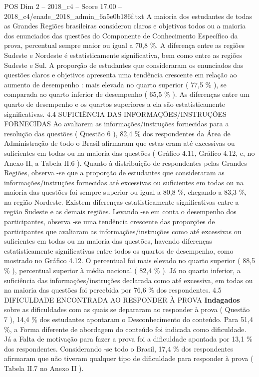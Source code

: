 \begin{textsample}{POS Dim 2 – 2018\_c4 – Score 17.00 – 2018\_c4/enade\_2018\_admin\_6a5e0b186f.txt}
A maioria dos estudantes de todas as Grandes Regiões brasileiras considerou claros e objetivos todos ou a maioria dos enunciados das questões do Componente de Conhecimento Específico da prova, percentual sempre maior ou igual a 70,8 \%.
A diferença entre as regiões Sudeste e Nordeste é estatisticamente significativa, bem como entre as regiões Sudeste e Sul.
A proporção de estudantes que consideraram os enunciados das questões claros e objetivos apresenta uma tendência crescente em relação ao aumento de desempenho : mais elevada no quarto superior ( 77,5 \% ), se comparada ao quarto inferior de desempenho ( 65,5 \% ).
As diferenças entre um quarto de desempenho e os quartos superiores a ela são estatisticamente significativas. 4.4 SUFICIÊNCIA DAS INFORMAÇÕES/INSTRUÇÕES FORNECIDAS Ao avaliarem as informações/instruções fornecidas para a resolução das questões ( Questão 6 ), 82,4 \% dos respondentes da Área de Administração de todo o Brasil afirmaram que estas eram até excessivas ou suficientes em todas ou na maioria das questões ( Gráfico 4.11, Gráfico 4.12, e, no Anexo II, a Tabela II.6 ).
Quanto à distribuição de respondentes pelas Grandes Regiões, observa -se que a proporção de estudantes que consideraram as informações/instruções fornecidas até excessivas ou suficientes em todas ou na maioria das questões foi sempre superior ou igual a 80,8 \%, chegando a 83,3 \%, na região Nordeste.
Existem diferenças estatisticamente significativas entre a região Sudeste e as demais regiões.
Levando -se em conta o desempenho dos participantes, observa -se uma tendência crescente das proporções de participantes que avaliaram as informações/instruções como até excessivas ou suficientes em todas ou na maioria das questões, havendo diferenças estatisticamente significativas entre todos os quartos de desempenho, como mostrado no Gráfico 4.12.
O percentual foi mais elevado no quarto superior ( 88,5 \% ), percentual superior à média nacional ( 82,4 \% ).
Já no quarto inferior, a suficiência das informações/instruções declarada como até excessiva, em todas ou na maioria das questões foi percebida por 76,6 \% dos respondentes. 4.5 DIFICULDADE ENCONTRADA AO RESPONDER À PROVA \textbf{Indagados} sobre as dificuldades com as quais se depararam ao responder à prova ( Questão 7 ), 14,4 \% dos estudantes apontaram o Desconhecimento do conteúdo.
Para 51,4 \%, a Forma diferente de abordagem do conteúdo foi indicada como dificuldade.
Já a Falta de motivação para fazer a prova foi a dificuldade apontada por 13,1 \% dos respondentes.
Considerando -se todo o Brasil, 17,4 \% dos respondentes afirmaram que não tiveram qualquer tipo de dificuldade para responder à prova ( Tabela II.7 no Anexo II ).

\end{textsample}

